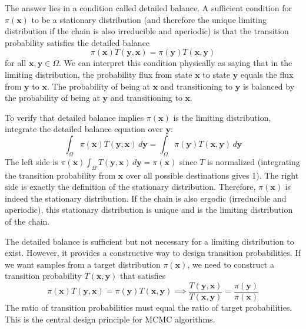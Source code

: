 The answer lies in a condition called detailed balance. A sufficient condition for $\pi(\mathbf{x})$ to be a stationary distribution (and therefore the unique limiting distribution if the chain is also irreducible and aperiodic) is that the transition probability satisfies the detailed balance
\begin{equation}
    \pi(\mathbf{x}) T(\mathbf{y}, \mathbf{x}) = \pi(\mathbf{y}) T(\mathbf{x}, \mathbf{y})
\end{equation}
for all $\mathbf{x}, \mathbf{y} \in \Omega$. We can interpret this condition physically as saying that in the limiting distribution, the probability flux from state $\mathbf{x}$ to state $\mathbf{y}$ equals the flux from $\mathbf{y}$ to $\mathbf{x}$. The probability of being at $\mathbf{x}$ and transitioning to $\mathbf{y}$ is balanced by the probability of being at $\mathbf{y}$ and transitioning to $\mathbf{x}$.

To verify that detailed balance implies $\pi(\mathbf{x})$ is the limiting distribution, integrate the detailed balance equation over $\mathbf{y}$:
\begin{equation}
    \int_{\Omega} \pi(\mathbf{x}) T(\mathbf{y}, \mathbf{x}) \, d\mathbf{y} = \int_{\Omega} \pi(\mathbf{y}) T(\mathbf{x}, \mathbf{y}) \, d\mathbf{y}
\end{equation}
The left side is $\pi(\mathbf{x}) \int_{\Omega} T(\mathbf{y}, \mathbf{x}) \, d\mathbf{y} = \pi(\mathbf{x})$ since $T$ is normalized (integrating the transition probability from $\mathbf{x}$ over all possible destinations gives 1). The right side is exactly the definition of the stationary distribution. Therefore, $\pi(\mathbf{x})$ is indeed the stationary distribution. If the chain is also ergodic (irreducible and aperiodic), this stationary distribution is unique and is the limiting distribution of the chain.

The detailed balance is sufficient but not necessary for a limiting distribution to exist. However, it provides a constructive way to design transition probabilities. If we want samples from a target distribution $\pi(\mathbf{x})$, we need to construct a transition probability $T(\mathbf{x}, \mathbf{y})$ that satisfies
\begin{equation}
    \pi(\mathbf{x}) T(\mathbf{y}, \mathbf{x}) = \pi(\mathbf{y}) T(\mathbf{x}, \mathbf{y})
    \implies
    \frac{T(\mathbf{y}, \mathbf{x})}{T(\mathbf{x}, \mathbf{y})} = \frac{\pi(\mathbf{y})}{\pi(\mathbf{x})}
\end{equation}
The ratio of transition probabilities must equal the ratio of target probabilities. This is the central design principle for MCMC algorithms.

